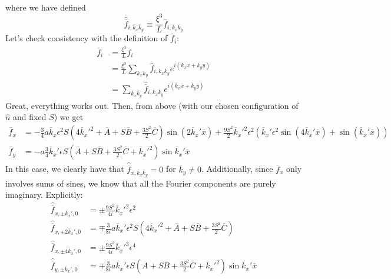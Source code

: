 \documentclass[reqno]{article}
\begin{document}
	where we have defined
	\begin{equation}
	\hat{\overline{f}}_{i, \overline{k}_x \overline{k}_y} 
	\equiv \frac{\xi^3}{L} \hat{f}_{i, \overline{k}_x \overline{k}_y}
	\end{equation}
	Let's check consistency with the definition of $\overline{f}_i$:
	\begin{equation}
	\begin{split}
	\overline{f}_i
	&= \frac{\xi^3}{L} f_i \\
	&= \frac{\xi^3}{L} \sum_{k_x k_y}
	\hat{f}_{i, k_x k_y} e^{i\left( k_x x + k_y y \right)} \\
	&= \sum_{\overline{k}_x \overline{k}_y}
	\hat{\overline{f}}_{i, \overline{k}_x \overline{k}_y}
	e^{i \left( \overline{k}_x \overline{x} + \overline{k}_y \overline{y} \right)}
	\end{split}
	\end{equation}
	Great, everything works out. 
	Then, from above (with our chosen configuration of $\hat{n}$ and fixed $S$) we get
	\begin{equation}
	\begin{split}
	\overline{f}_x
	&= -\tfrac34 a \overline{k}_x \epsilon^2 S \left( 
	4 \overline{k}_x'^2
	+ \overline{A} 
	+ S\overline{B}
	+ \frac{3 S^2}{2} \overline{C}
	\right) 
	\sin \left(
	2 \overline{k}_x' \overline{x}
	\right)
	+ \frac{9 S^2}{2}\overline{k}_x'^2 \epsilon^2
	\left(
	\overline{k}_x' \epsilon^2 \sin \left(
	4 \overline{k}_x' \overline{x}
	\right)
	+ \sin \left(
	\overline{k}_x' \overline{x}
	\right)
	\right) \\
	\overline{f}_y
	&= -a \tfrac34 \overline{k}_x' \epsilon S
	\left(
	\overline{A}
	+ S \overline{B}
	+ \frac{3 S^2}{2} \overline{C} 
	+ \overline{k}_x'^2
	\right)
	\sin \overline{k}_x' \overline{x}
	\end{split}
	\end{equation}
	In this case, we clearly have that $\hat{\overline{f}}_{x, \overline{k}_x \overline{k}_y} = 0$ for $\overline{k}_y \neq 0$. Additionally, since $\overline{f}_x$ only involves sums of sines, we know that all the Fourier components are purely imaginary. Explicitly:
	\begin{equation}
	\begin{split}
	\hat{\overline{f}}_{x, \pm\overline{k}_x', 0}
	&= \pm\frac{9 S^2}{4i} \overline{k}_x'^2 \epsilon^2 \\
	\hat{\overline{f}}_{x, \pm 2 \overline{k}_x', 0}
	&= \mp\frac{3}{8i} a \overline{k}_x' \epsilon^2 S \left(
	4 \overline{k}_x'^2 
	+ \overline{A} 
	+ S \overline{B}
	+ \frac{3 S^2}{2} \overline{C}
	\right) \\
	\hat{\overline{f}}_{x, \pm 4\overline{k}_x', 0}
	&= \pm \frac{9 S^2}{4i} \overline{k}_x'^3 \epsilon^4 \\
	\hat{\overline{f}}_{y, \pm \overline{k}_x', 0}
	&= \mp \frac{3}{8i} a \overline{k}_x' \epsilon S
	\left(
	\overline{A} 
	+ S\overline{B}
	+ \frac{3S^2}{2} \overline{C}
	+ \overline{k}_x'^2
	\right)
	\sin \overline{k}_x' \overline{x}
	\end{split}
	\end{equation}
\end{document}
